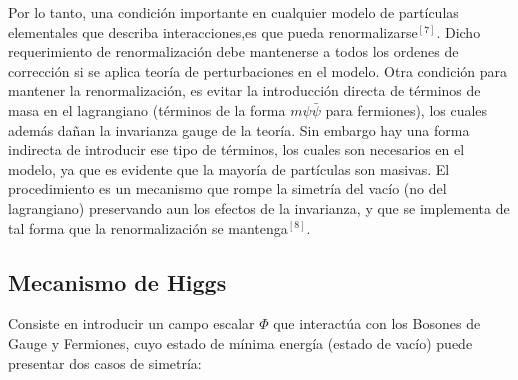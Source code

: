 \documentclass[12pt]{article}
\begin{document}
Por lo tanto, una condición importante en cualquier modelo de partículas elementales que describa interacciones,es que pueda renormalizarse$^{[7]}$. Dicho requerimiento de renormalización debe mantenerse a todos los ordenes de corrección si se aplica teoría de perturbaciones en el modelo. Otra condición para mantener la renormalización, es evitar la introducción directa de términos de masa en el lagrangiano (términos de la forma $m\psi\bar{\psi}$ para fermiones), los cuales además dañan la invarianza gauge de la teoría. Sin embargo hay una forma indirecta de introducir ese tipo de términos, los cuales son necesarios en el modelo, ya que es evidente que la mayoría de partículas son masivas. El procedimiento es un mecanismo que rompe la simetría del vacío (no del lagrangiano) preservando aun los efectos de la invarianza, y que se implementa de tal forma que la renormalización se mantenga$^{[8]}$. 


\subsection{Mecanismo de Higgs}

Consiste en introducir un campo escalar \(\Phi\) que interactúa con los Bosones de Gauge y Fermiones, cuyo estado de mínima energía (estado de vacío) puede presentar dos casos de simetría:
\end{document}
